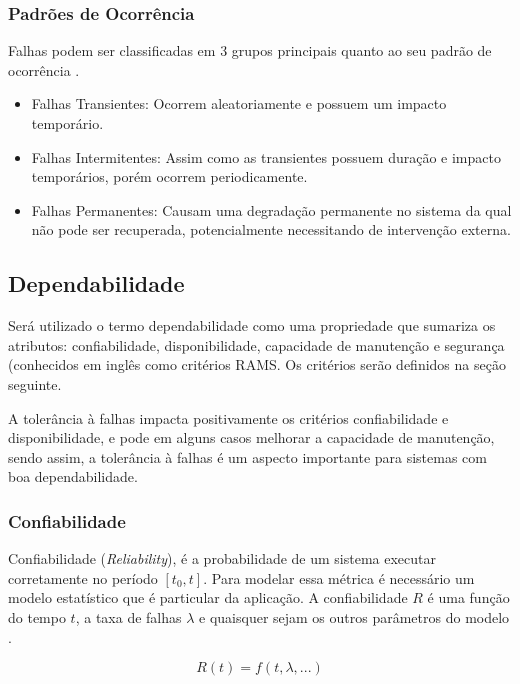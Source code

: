 \subsubsection{Padrões de Ocorrência}

Falhas podem ser classificadas em 3 grupos principais quanto ao seu padrão de ocorrência \cite{FaultTolerantSystems}.

\begin{itemize}
    \item Falhas Transientes: Ocorrem aleatoriamente e possuem um impacto temporário.

    \item Falhas Intermitentes: Assim como as transientes possuem duração e impacto temporários, porém ocorrem periodicamente.

    \item Falhas Permanentes: Causam uma degradação permanente no sistema da qual não pode ser recuperada, potencialmente necessitando de intervenção externa.
\end{itemize}

\subsection{Dependabilidade}

Será utilizado o termo dependabilidade como uma propriedade que sumariza os atributos:  confiabilidade, disponibilidade, capacidade de manutenção e segurança (conhecidos em inglês como critérios RAMS. Os critérios serão definidos na seção seguinte.

A tolerância à falhas impacta positivamente os critérios confiabilidade e disponibilidade, e pode em alguns casos melhorar a capacidade de manutenção, sendo assim, a tolerância à falhas é um aspecto importante para sistemas com boa dependabilidade.

\subsubsection{Confiabilidade}

Confiabilidade (\textit{Reliability}), é a probabilidade de um sistema executar corretamente no período $[t_0, t]$. Para modelar essa métrica é necessário um modelo estatístico que é particular da aplicação. A confiabilidade $R$ é uma função do tempo $t$, a taxa de falhas $\lambda$ e quaisquer sejam os outros parâmetros do modelo \cite{FaultInjectionTechniques}.

\begin{equation}
    R(t) = f(t, \lambda, ...)
\end{equation}

